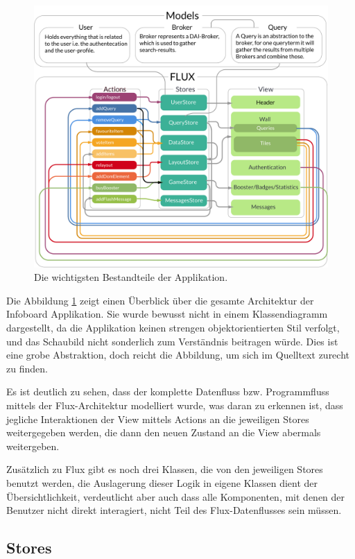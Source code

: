 \documentclass[12pt,twoside]{book}
\begin{document}
\begin{figure}[htbp]
    \centering
    \includegraphics[width=1.0\textwidth]{images/architecture.pdf}
    \caption{Die wichtigsten Bestandteile der Applikation.}
    \label{fig:architecture}
\end{figure}

Die Abbildung \ref{fig:architecture} zeigt einen Überblick über die gesamte Architektur der Infoboard Applikation. Sie wurde bewusst nicht in einem Klassendiagramm dargestellt, da die Applikation keinen strengen objektorientierten Stil verfolgt, und das Schaubild nicht sonderlich zum Verständnis beitragen würde. Dies ist eine grobe Abstraktion, doch reicht die Abbildung, um sich im Quelltext zurecht zu finden.

Es ist deutlich zu sehen, dass der komplette Datenfluss bzw. Programmfluss mittels der Flux-Architektur modelliert wurde, was daran zu erkennen ist, dass jegliche Interaktionen der View mittels Actions an die jeweiligen Stores weitergegeben werden, die dann den neuen Zustand an die View abermals weitergeben.

Zusätzlich zu Flux gibt es noch drei Klassen, die von den jeweiligen Stores benutzt werden, die Auslagerung dieser Logik in eigene Klassen dient der Übersichtlichkeit, verdeutlicht aber auch dass alle Komponenten, mit denen der Benutzer nicht direkt interagiert, nicht Teil des Flux-Datenflusses sein müssen.

\subsection{Stores}
\end{document}
